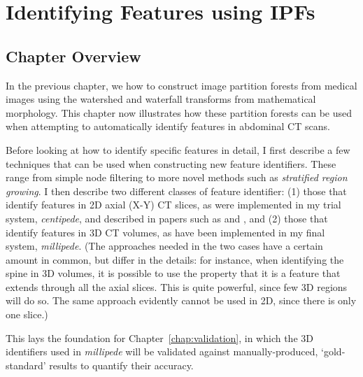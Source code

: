 \chapter{Identifying Features using IPFs}
\label{chap:featureid}

\section{Chapter Overview}

In the previous chapter, we  how to construct image partition forests from medical images using the watershed and waterfall transforms from mathematical morphology. This chapter now illustrates how these partition forests can be used when attempting to automatically identify features in abdominal CT scans.

Before looking at how to identify specific features in detail, I first describe a few techniques that can be used when constructing new feature identifiers. These range from simple node filtering to more novel methods such as \emph{stratified region growing}. I then describe two different classes of feature identifier: (1) those that identify features in 2D axial (X-Y) CT slices, as were implemented in my trial system, \emph{centipede}, and described in papers such as \cite{gvccimi08} and \cite{gvcispa09}, and (2) those that identify features in 3D CT volumes, as have been implemented in my final system, \emph{millipede}. (The approaches needed in the two cases have a certain amount in common, but differ in the details: for instance, when identifying the spine in 3D volumes, it is possible to use the property that it is a feature that extends through all the axial slices. This is quite powerful, since few 3D regions will do so. The same approach evidently cannot be used in 2D, since there is only one slice.)

This lays the foundation for Chapter~\ref{chap:validation}, in which the 3D identifiers used in \emph{millipede} will be validated against manually-produced, `gold-standard' results to quantify their accuracy.


